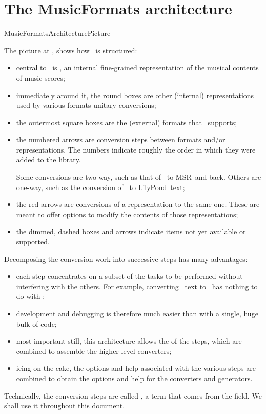 
\chapter{The MusicFormats architecture}\label{The MusicFormats architecture}

{MusicFormatsArchitecturePicture}

The picture at , shows how \mf\ is structured:
\begin{itemize}
\item central to \mf\ is \msrRepr, an internal fine-grained representation of the musical contents of music scores;

\item immediately around it, the round boxes are other (internal) representations used by various formats unitary conversions;

\item the outermost square boxes are the (external) formats that \mf\ supports;

\item the numbered arrows are conversion steps between formats and/or representations. The numbers indicate roughly the order in which they were added to the library.

Some conversions are two-way, such as that of \mxsrRepr\ to MSR\ and back. Others are one-way, such as the conversion of \lpsrRepr\ to LilyPond\ text;

\item the red arrows are conversions of a representation to the same one. These are meant to offer options to modify the contents of those representations;

\item the dimmed, dashed boxes and arrows indicate items not yet available or supported.

\end{itemize}

Decomposing the conversion work into successive steps has many advantages:
\begin{itemize}
\item each step concentrates on a subset of the tasks to be performed without interfering with the others. For example, converting \mxml\ text to \msrRepr\ has nothing to do with \lily;

\item development and debugging is therefore much easier than with a single, huge bulk of code;

\item most important still, this architecture allows the  of the steps, which are combined to assemble the higher-level converters;

\item icing on the cake, the options and help associated with the various steps are combined to obtain the options and help for the converters and generators.
\end{itemize}

Technically, the conversion steps are called , a term that comes from the  field. We shall use it throughout this document.
